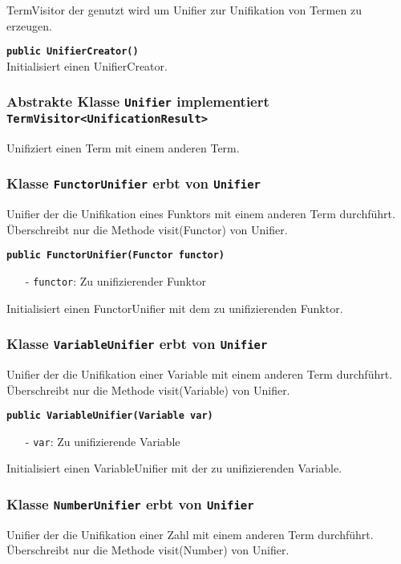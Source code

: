 \documentclass[parskip=full,11pt,twoside]{scrartcl}
\begin{document}
TermVisitor der genutzt wird um Unifier zur Unifikation von Termen zu erzeugen.

\textbf{\texttt{public UnifierCreator()}}\\
Initialisiert einen UnifierCreator.

\subsubsection{Abstrakte Klasse \texttt{Unifier} implementiert \texttt{TermVisitor<UnificationResult>}}

Unifiziert einen Term mit einem anderen Term.

\subsubsection{Klasse \texttt{FunctorUnifier} erbt von \texttt{Unifier}}
Unifier der die Unifikation eines Funktors mit einem anderen Term durchführt. Überschreibt nur die Methode visit(Functor) von Unifier.

\textbf{\texttt{public FunctorUnifier(Functor functor)}}
\begin{itemize}[noitemsep]
	\item[-] \texttt{functor}: Zu unifizierender Funktor
\end{itemize}
Initialisiert einen FunctorUnifier mit dem zu unifizierenden Funktor.

\subsubsection{Klasse \texttt{VariableUnifier} erbt von \texttt{Unifier}}
Unifier der die Unifikation einer Variable mit einem anderen Term durchführt. Überschreibt nur die Methode visit(Variable) von Unifier.

\textbf{\texttt{public VariableUnifier(Variable var)}}
\begin{itemize}[noitemsep]
	\item[-] \texttt{var}: Zu unifizierende Variable
\end{itemize}
Initialisiert einen VariableUnifier mit der zu unifizierenden Variable.

\subsubsection{Klasse \texttt{NumberUnifier} erbt von \texttt{Unifier}}

Unifier der die Unifikation einer Zahl mit einem anderen Term durchführt. Überschreibt nur die Methode visit(Number) von Unifier.
\end{document}
